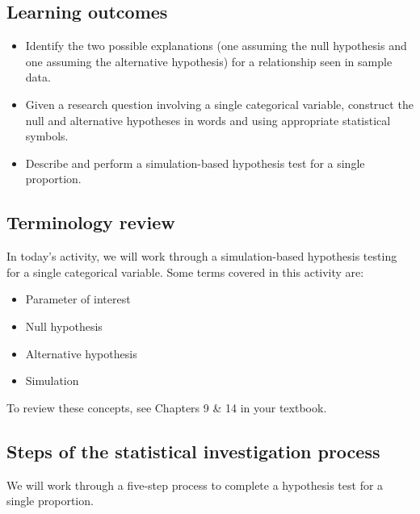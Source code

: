 \documentclass[
]{report}
\begin{document}
\subsection{Learning outcomes}\label{learning-outcomes-3}

\begin{itemize}
\item
  Identify the two possible explanations (one assuming the null hypothesis and one assuming the alternative hypothesis) for a relationship seen in sample data.
\item
  Given a research question involving a single categorical variable, construct the null and alternative hypotheses
  in words and using appropriate statistical symbols.
\item
  Describe and perform a simulation-based hypothesis test for a single proportion.
\end{itemize}

\subsection{Terminology review}\label{terminology-review-3}

In today's activity, we will work through a simulation-based hypothesis testing for a single categorical variable. Some terms covered in this activity are:

\begin{itemize}
\item
  Parameter of interest
\item
  Null hypothesis
\item
  Alternative hypothesis
\item
  Simulation
\end{itemize}

To review these concepts, see Chapters 9 \& 14 in your textbook.

\subsection{Steps of the statistical investigation process}\label{steps-of-the-statistical-investigation-process-1}

We will work through a five-step process to complete a hypothesis test for a single proportion.
\end{document}
